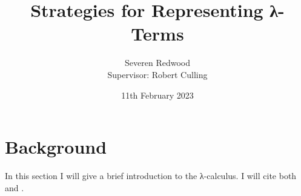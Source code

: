 \documentclass[headings=standardclasses]{scrartcl}
\title{Strategies for Representing λ-Terms}
\author{Severen Redwood \\ {\small Supervisor: Robert Culling}}
\date{11th February 2023}
\theoremstyle{definition}
\begin{document}
\let\oldleq=\leq{}
\let\oldgeq=\geq{}
\renewcommand{\leq}{\leqslant}
\renewcommand{\geq}{\geqslant}

\maketitle

\section{Background}

In this section I will give a brief introduction to the λ-calculus. I will cite
both \textcite{hindley_seldin} and \textcite{pierce}.

\printbibliography[heading=bibintoc]
\end{document}
